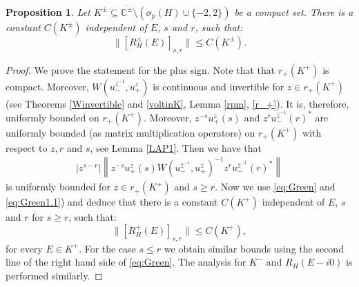 \documentclass[12pt,oneside,onecolumn,open]{article}
\newtheorem{propo}[teo]{Proposition}
\begin{document}
\begin{propo}\label{LAP2}
   Let $K^{\pm}\subseteq  \overline{\mathbb{C}^{\pm}}\setminus ( \sigma_p (H)\cup \{-2,2 \} )$ be a compact set. %
   There is a constant $C(K^{\pm})$ independent of $E$, $s$ and $r$, such that:
   \begin{equation}\label{i2}
       \|[R^{\pm}_{H}(E)]_{s,r}\|\leq C(K^\pm).
   \end{equation}
\end{propo}
\begin{proof} We prove the statement for the plus sign.   Note that  that $r_+(K^+)$ is compact. Moreover,  $W(u_-^{\overline{z}^{-1}}, u_+^{z})$ is continuous and invertible for $ z \in  r_+(K^+)  $ (see Theorems \ref{Winvertible} and \ref{voltinK}, Lemma \ref{rpm}, \eqref{r_+}). It is, therefore, uniformly bounded on 
$ r_+(K^+) .$  Moreover,  $z^{-s}u_+^{z}(s)$ and $z^ r u_-^{\overline{z}^{-1}}(r)^{*}$ are uniformly bounded (as matrix multiplication operators) on $ r_+(K^+) $ with respect to $z,  r$ and $s$, see Lemma \ref{LAP1}. Then we have that 
\begin{align}
    |z^{s-r}|\left\|z^{-s}u_+^{z}(s)W(u_-^{\overline{z}^{-1}}, u_+^{z})^{-1}z^{r}u_-^{\overline{z}^{-1}}(r)^{*}\right\|\end{align}
    is uniformly bounded for $z \in r_+(K^+)$ and $  s \geq r . $ Now we use  \eqref{eq:Green} and \eqref{eq:Green1.1})  and deduce that 
   there is a constant $C(K^+)$ independent of $E$, $s$ and $r$ for $s\geq r$, such that:
   \begin{equation}
       \|[R^{+}_{H}(E)]_{s,r}\|\leq C(K^+),
   \end{equation}
   for every $ E \in K^+  .$ %
For the  case $ s \leq r$ we obtain similar bounds using the second line of the right hand side of \eqref{eq:Green}.  The analysis for $  K^- $ and $R_{H}(E - i 0)$ is performed similarly. 
    
    
    
   
\end{proof}
 
\end{document}
